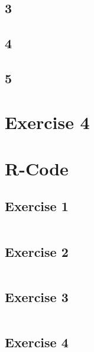 \documentclass{article}
\begin{document}
    \subsection*{3}
    \subsection*{4}
    \subsection*{5}

  \section*{Exercise 4}
    
  \section{R-Code}
    \subsection{Exercise 1}\label{sec:RE1}
      \begin{lstlisting}[language=R]
      \end{lstlisting}
    \subsection{Exercise 2}\label{sec:RE2}
      \begin{lstlisting}[language=R]
      \end{lstlisting}
    \subsection{Exercise 3}\label{sec:RE3}
      \begin{lstlisting}[language=R]
      \end{lstlisting}
    \subsection{Exercise 4}\label{sec:RE4}
      \begin{lstlisting}[language=R]
      \end{lstlisting}
\end{document}
